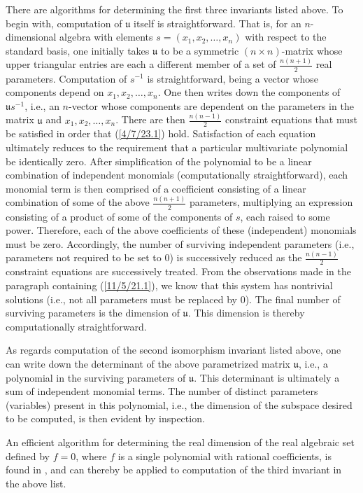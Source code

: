 \documentclass{amsart}
\numberwithin{equation}{section}
\theoremstyle{definition}
\numberwithin{theorem}{section}
\begin{document}
There are algorithms for determining the first three invariants listed above.  To begin with, computation of $\mathfrak{u}$ itself is straightforward.  That is, for an $n$-dimensional algebra with elements $s = (x_1,x_2,\dots,x_n)$ with respect to the standard basis, one initially takes $\mathfrak{u}$ to be a symmetric $(n\times n)$-matrix  whose upper triangular entries are each a different member of a set of $\frac{n(n+1)}{2}$ real parameters.  Computation of $s^{-1}$ is straightforward, being a vector whose components depend on $x_1,x_2,\dots,x_n$.  One then writes down the components of $\mathfrak{u}s^{-1}$, i.e., an $n$-vector whose components are dependent on the parameters in the matrix $\mathfrak{u}$ and $x_1,x_2,\dots,x_n$.  There are then $\frac{n(n-1)}{2}$ constraint equations that must be satisfied in order that (\ref{4/7/23.1}) hold.  Satisfaction of each equation ultimately reduces to the requirement that a particular multivariate polynomial be identically zero.  After simplification of the polynomial to be a linear combination of independent monomials (computationally straightforward), each monomial term is then comprised of a coefficient consisting of a linear combination of some of the above $\frac{n(n+1)}{2}$ parameters, multiplying an expression consisting of a product of some of the components of $s$, each raised to some power.  Therefore, each of the above coefficients of these (independent) monomials must be zero.  Accordingly, the number of surviving independent parameters (i.e., parameters not required to be set to 0) is successively reduced as the $\frac{n(n-1)}{2}$ constraint equations are successively treated. From the observations made in the paragraph containing (\ref{11/5/21.1}), we know that this system has nontrivial solutions (i.e., not all parameters must be replaced by 0).   The final number of surviving parameters is the dimension of $\mathfrak{u}$.  This dimension is thereby computationally straightforward.

As regards computation of the second isomorphism invariant listed above, one can write down the determinant of the above parametrized matrix $\mathfrak{u}$, i.e., a polynomial in the surviving parameters of $\mathfrak{u}$.  This determinant is ultimately a sum of independent monomial terms.  The number of distinct parameters (variables) present in this polynomial, i.e., the dimension of the subspace desired to be computed, is then evident by inspection.

An efficient algorithm for determining the real dimension of the real algebraic set defined by $f=0$, where $f$ is a single polynomial with rational coefficients, is found in \cite{bannwarth:2015}, and can thereby be applied to computation of the third invariant in the above list. 
\end{document}
